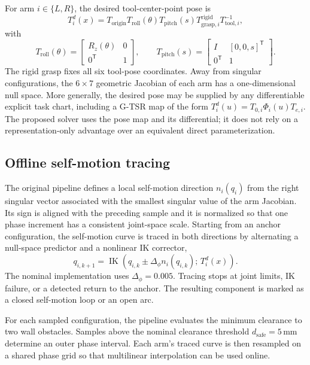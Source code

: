 \documentclass[preprint,12pt]{elsarticle}
\newcommand{\T}{^{\mathsf T}}
\begin{document}
For arm $i\in\{L,R\}$, the desired tool-center-point pose is
\begin{equation}
T_i^d(x)
=
T_{\mathrm{origin}}
T_{\mathrm{roll}}(\theta)
T_{\mathrm{pitch}}(s)
T_{\mathrm{grasp},i}^{\mathrm{rigid}}
T_{\mathrm{tool},i}^{-1},
\label{eq:target_pose}
\end{equation}
with
\begin{equation}
T_{\mathrm{roll}}(\theta)
=
\begin{bmatrix}R_z(\theta)&0\\0\T&1\end{bmatrix},
\qquad
T_{\mathrm{pitch}}(s)
=
\begin{bmatrix}I&[0,0,s]\T\\0\T&1\end{bmatrix}.
\end{equation}
The rigid grasp fixes all six tool-pose coordinates. Away from singular configurations, the $6\times7$ geometric Jacobian of each arm has a one-dimensional null space. More generally, the desired pose may be supplied by any differentiable explicit task chart, including a G-TSR map of the form $T_i^d(u)=T_{0,i}\Phi_i(u)T_{e,i}$. The proposed solver uses the pose map and its differential; it does not rely on a representation-only advantage over an equivalent direct parameterization.

\subsection{Offline self-motion tracing}

The original pipeline defines a local self-motion direction $n_i(q_i)$ from the right singular vector associated with the smallest singular value of the arm Jacobian. Its sign is aligned with the preceding sample and it is normalized so that one phase increment has a consistent joint-space scale. Starting from an anchor configuration, the self-motion curve is traced in both directions by alternating a null-space predictor and a nonlinear IK corrector,
\begin{equation}
q_{i,k+1}
=
\operatorname{IK}\!\left(q_{i,k}\pm \Delta_\phi n_i(q_{i,k});\,T_i^d(x)\right).
\label{eq:lut_arc_trace}
\end{equation}
The nominal implementation uses $\Delta_\phi=0.005$. Tracing stops at joint limits, IK failure, or a detected return to the anchor. The resulting component is marked as a closed self-motion loop or an open arc.

For each sampled configuration, the pipeline evaluates the minimum clearance to two wall obstacles. Samples above the nominal clearance threshold $d_{\mathrm{safe}}=5\,\mathrm{mm}$ determine an outer phase interval. Each arm's traced curve is then resampled on a shared phase grid so that multilinear interpolation can be used online.
\end{document}
